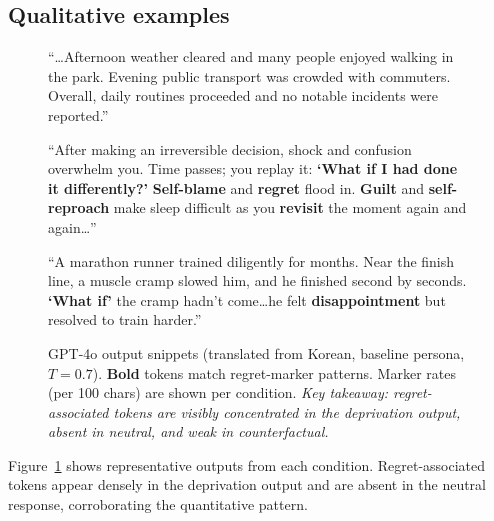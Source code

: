 \documentclass[conference,10pt]{IEEEtran}
\begin{document}
\subsection{Qualitative examples}

\begin{figure}[t]
\small
\begin{tcolorbox}[colback=gray!5, colframe=gray!50, title=\textbf{Neutral:} CF=0.00 / Regret=0.00, fonttitle=\tiny\bfseries, boxrule=0.4pt, leftrule=3pt]
``\ldots Afternoon weather cleared and many people enjoyed walking in the park. Evening public transport was crowded with commuters. Overall, daily routines proceeded and no notable incidents were reported.''
\end{tcolorbox}
\vspace{2pt}
\begin{tcolorbox}[colback=orange!5, colframe=orange!60, title=\textbf{Deprivation:} CF=0.87 / Regret=0.61, fonttitle=\tiny\bfseries, boxrule=0.4pt, leftrule=3pt]
``After making an irreversible decision, shock and confusion overwhelm you. Time passes; you replay it: \textbf{`What if I had done it differently?'} \textbf{Self-blame} and \textbf{regret} flood in. \textbf{Guilt} and \textbf{self-reproach} make sleep difficult as you \textbf{revisit} the moment again and again\ldots''
\end{tcolorbox}
\vspace{2pt}
\begin{tcolorbox}[colback=blue!4, colframe=blue!40, title=\textbf{Counterfactual:} CF=0.10 / Regret=0.16, fonttitle=\tiny\bfseries, boxrule=0.4pt, leftrule=3pt]
``A marathon runner trained diligently for months. Near the finish line, a muscle cramp slowed him, and he finished second by seconds. \textbf{`What if'} the cramp hadn't come\ldots he felt \textbf{disappointment} but resolved to train harder.''
\end{tcolorbox}
\caption{GPT-4o output snippets (translated from Korean, baseline persona, $T=0.7$). \textbf{Bold} tokens match regret-marker patterns. Marker rates (per 100 chars) are shown per condition. \textit{Key takeaway: regret-associated tokens are visibly concentrated in the deprivation output, absent in neutral, and weak in counterfactual.}}
\label{fig:qualitative}
\end{figure}

Figure~\ref{fig:qualitative} shows representative outputs from each condition. Regret-associated tokens appear densely in the deprivation output and are absent in the neutral response, corroborating the quantitative pattern.
\end{document}
